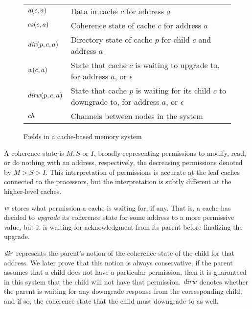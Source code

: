 \begin{figure}[h]
\centering
\begin{tabular}{|l|p{6cm}|}
\hline
$\mathit{d}(c,a)$ & Data in cache $c$ for address $a$\\
$\mathit{cs}(c,a)$ & Coherence state of cache $c$ for address $a$\\
$\mathit{dir}(p,c,a)$ & Directory state of cache $p$ for child $c$ and address $a$\\
$\mathit{w}(c,a)$ & State that cache $c$ is waiting to upgrade to, for address $a$, or $\epsilon$\\ %
$\mathit{dirw}(p,c,a)$ & State that cache $p$ is waiting for its child $c$ to downgrade to, for address $a$, or $\epsilon$\\
$\mathit{ch}$ & Channels between nodes in the system\\
\hline
\end{tabular}
\caption{Fields in a cache-based memory system}
\label{fields}
\end{figure}

A coherence state is $M, S$ or $I$, broadly representing permissions to modify,
read, or do nothing with an address, respectively, the decreasing permissions
denoted by $M > S > I$. This interpretation of permissions is accurate at the
leaf caches connected to the processors, but the
interpretation is subtly different at the higher-level caches.

$\mathit{w}$ stores what permission a cache is waiting for,
if any.  That is, a cache has decided to \emph{upgrade} its
coherence state for some address to a more permissive value, but
it is waiting for acknowledgment from its parent before
finalizing the upgrade.

$\mathit{dir}$ represents the parent's notion of the
coherence state of the child for that address. We later prove that this notion
is always conservative, \ie{} if the parent assumes that a child does not have
a particular permission, then it is guaranteed in this system that the child
will not have that permission.  $\mathit{dirw}$
denotes whether the parent is waiting for any downgrade response from the
corresponding child, and if so, the coherence state that the child must
downgrade to as well.

